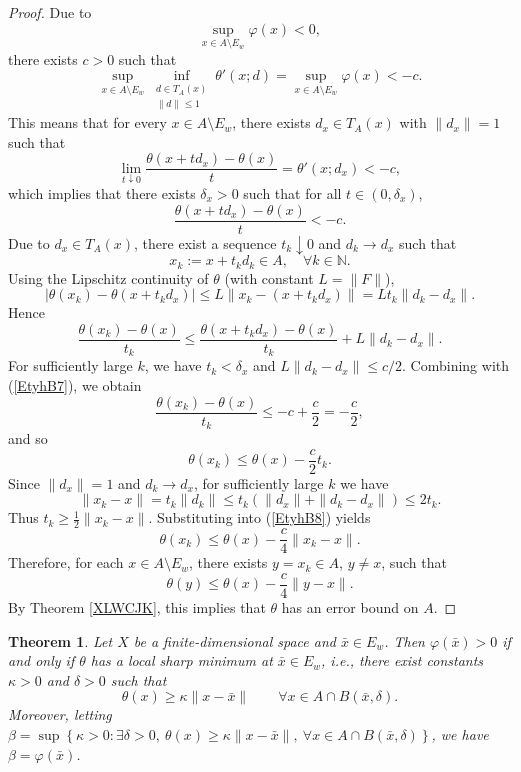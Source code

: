 \documentclass[11pt]{article}
\newtheorem{theorem}{Theorem}[section]
\begin{document}
 
 \begin{proof}   
 Due to
 	\[
 	\sup_{x \in A \setminus E_w} \varphi(x) < 0,
 	\]
   there exists $c > 0$ such that
 	\[
 	\sup_{x \in A \setminus E_w} \inf_{\substack{d\in T_A(x)\\\|d\|\le 1}}\theta'(x;d)  =  \sup_{x \in A \setminus E_w} \varphi(x) < -c.
 	\]
 	This means that for every $x \in A \setminus E_w$, there exists $d_x \in T_A(x)$ with $\|d_x\| = 1$ such that 
 	\[
 	\lim_{t \downarrow 0} \frac{\theta(x + t d_x) - \theta(x)}{t} = \theta'(x; d_x) < -c, 
 	\]
 	which implies that there exists $\delta_x > 0$ such that for all $t \in (0, \delta_x)$,
 	\begin{equation}\label{EtyhB7}
 		\frac{\theta(x + t d_x) - \theta(x)}{t} < -c.
 	\end{equation}
 Due to $d_x \in T_A(x)$, there exist a sequence $t_k \downarrow 0$ and $d_k \to d_x$ such that
 	\[
 	x_k := x + t_k d_k \in A, \quad \forall k \in \mathbb{N}.
 	\]
 	Using the Lipschitz continuity of $\theta$ (with constant $L = \|F\|$),
 	\[
 	|\theta(x_k) - \theta(x + t_k d_x)| \le L \|x_k - (x + t_k d_x)\| = L t_k \|d_k - d_x\|.
 	\]
 	Hence
 	\[
 	\frac{\theta(x_k) - \theta(x)}{t_k}
 	\le \frac{\theta(x + t_k d_x) - \theta(x)}{t_k} + L \|d_k - d_x\|.
 	\]
 	For sufficiently large $k$, we have $t_k < \delta_x$ and $L \|d_k - d_x\| \le c/2$. Combining with (\ref{EtyhB7}), we obtain
 	\[
 	\frac{\theta(x_k) - \theta(x)}{t_k} \le -c + \frac{c}{2} = -\frac{c}{2},
 	\]
 	and so
 	\begin{equation}\label{EtyhB8}
 		\theta(x_k) \le \theta(x) - \frac{c}{2} t_k.
 	\end{equation}
 	Since $\|d_x\| = 1$ and $d_k \to d_x$, for sufficiently large $k$ we have
 	\[
 	\|x_k - x\| = t_k \|d_k\| \le t_k (\|d_x\| + \|d_k - d_x\|) \le 2 t_k .
 	\]
 	Thus $t_k \ge \frac{1}{2}\|x_k - x\|$. Substituting into (\ref{EtyhB8}) yields
 	\[
 	\theta(x_k) \le \theta(x) - \frac{c}{4} \|x_k - x\|.
 	\]
 	Therefore, for each $x \in A \setminus E_w$, there exists $y = x_k \in A$, $y \neq x$, such that
 	\[
 	\theta(y) \le \theta(x) - \frac{c}{4} \|y - x\|.
 	\]
 	By Theorem \ref{XLWCJK}, this implies that  $\theta$ has an error bound on $A$.
 \end{proof}
 
 \begin{theorem} \label{TRgfd} 
 	Let $X$ be a  finite-dimensional   space and  $\bar{x} \in E_w$. Then  $	\varphi (\bar x) > 0$ if and only if  	$\theta$ has a local sharp minimum at   $\bar x\in E_w$,	i.e., there exist constants $\kappa > 0$ and $\delta > 0$ such that
 	\[
 	\theta(x) \ge \kappa \|x - \bar x\| \qquad \forall x \in A \cap B(\bar x, \delta).
 	\]
  	Moreover, letting $\beta = \sup \left\{ \kappa > 0 : \exists \delta > 0,\ \theta(x) \ge \kappa \|x - \bar x\|,\ \forall x \in A \cap B(\bar x, \delta) \right\}$, we have $\beta = \varphi (\bar x)$.
 \end{theorem}
 
\end{document}
